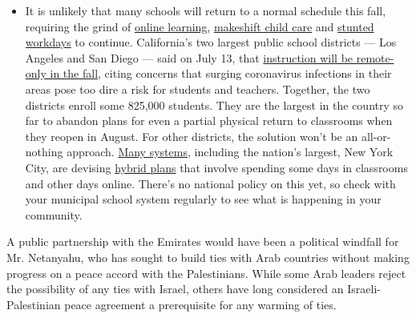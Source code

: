 \begin{itemize}
  \begin{itemize}
  \tightlist
  \item
    It is unlikely that many schools will return to a normal schedule
    this fall, requiring the grind of
    \href{https://www.nytimes3xbfgragh.onion/2020/06/05/us/coronavirus-education-lost-learning.html?action=click\&pgtype=Article\&state=default\&region=MAIN_CONTENT_3\&context=storylines_faq}{online
    learning},
    \href{https://www.nytimes3xbfgragh.onion/2020/05/29/us/coronavirus-child-care-centers.html?action=click\&pgtype=Article\&state=default\&region=MAIN_CONTENT_3\&context=storylines_faq}{makeshift
    child care} and
    \href{https://www.nytimes3xbfgragh.onion/2020/06/03/business/economy/coronavirus-working-women.html?action=click\&pgtype=Article\&state=default\&region=MAIN_CONTENT_3\&context=storylines_faq}{stunted
    workdays} to continue. California's two largest public school
    districts --- Los Angeles and San Diego --- said on July 13, that
    \href{https://www.nytimes3xbfgragh.onion/2020/07/13/us/lausd-san-diego-school-reopening.html?action=click\&pgtype=Article\&state=default\&region=MAIN_CONTENT_3\&context=storylines_faq}{instruction
    will be remote-only in the fall}, citing concerns that surging
    coronavirus infections in their areas pose too dire a risk for
    students and teachers. Together, the two districts enroll some
    825,000 students. They are the largest in the country so far to
    abandon plans for even a partial physical return to classrooms when
    they reopen in August. For other districts, the solution won't be an
    all-or-nothing approach.
    \href{https://bioethics.jhu.edu/research-and-outreach/projects/eschool-initiative/school-policy-tracker/}{Many
    systems}, including the nation's largest, New York City, are
    devising
    \href{https://www.nytimes3xbfgragh.onion/2020/06/26/us/coronavirus-schools-reopen-fall.html?action=click\&pgtype=Article\&state=default\&region=MAIN_CONTENT_3\&context=storylines_faq}{hybrid
    plans} that involve spending some days in classrooms and other days
    online. There's no national policy on this yet, so check with your
    municipal school system regularly to see what is happening in your
    community.
  \end{itemize}
\end{itemize}

A public partnership with the Emirates would have been a political
windfall for Mr. Netanyahu, who has sought to build ties with Arab
countries without making progress on a peace accord with the
Palestinians. While some Arab leaders reject the possibility of any ties
with Israel, others have long considered an Israeli-Palestinian peace
agreement a prerequisite for any warming of ties.


